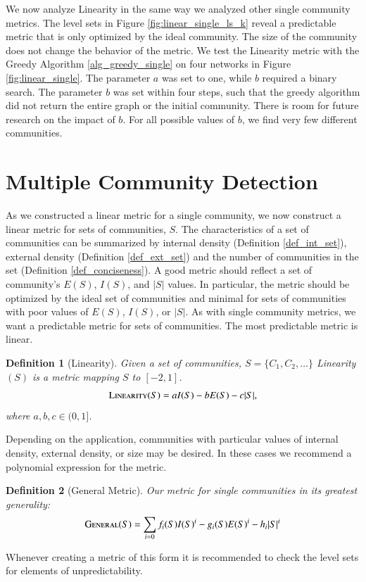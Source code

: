 \documentclass[phd,tocprelim]{cornell}
\newtheorem{definition}{Definition}
\begin{document}
We now analyze {\sc Linearity} in the same way we analyzed other single community metrics.  The level sets in Figure \ref{fig:linear_single_ls_k} reveal a predictable metric that is only optimized by the ideal community. The size of the community does not change the behavior of the metric.  We test the {\sc Linearity} metric  with the Greedy Algorithm \ref{alg_greedy_single} on four networks in Figure \ref{fig:linear_single}.  The parameter $a$ was set to one, while $b$ required a binary search.  The parameter $b$ was set within four steps, such that the greedy algorithm did not return the entire graph or the initial community. There is room for future research on the impact of $b$.  For all possible values of $b$, we find very few different communities.





\section{Multiple Community Detection}

As we constructed a linear metric for a single community, we now construct a linear metric for sets of communities, $S$.  The characteristics of a set of communities can be summarized by internal density (Definition \ref{def_int_set}), external density (Definition \ref{def_ext_set}) and the number of communities in the set (Definition \ref{def_conciseness}).  A good metric should reflect a set of community's $E(S)$, $I(S)$, and $|S|$ values.  In particular, the metric should be optimized by the ideal set of communities and minimal for sets of communities with poor values of $E(S)$, $I(S)$, or $|S|$.  As with single community metrics, we want a predictable metric for sets of communities.  The most predictable metric is linear.
\begin{definition}[Linearity] Given a set of communities, $S = \{C_1, C_2, \dots \}$ {\sc Linearity}$(S)$ is a metric mapping $S$ to $[-2, 1]$.
  \begin{equation}
   \mbox{\sc Linearity}(S) = a I(S) - b E(S) - c |S|,
  \end{equation}
where $a,b,c \in (0, 1]$.
\end{definition}
Depending on the application, communities with particular values of internal density, external density, or size may be desired.  In these cases we recommend a polynomial expression for the metric.
\begin{definition}[General Metric]
 Our metric for single communities in its greatest generality:
  \begin{equation}
   \mbox{\sc General} (S) = \sum\limits_{i = 0} f_i(S) I(S)^i - g_i(S) E(S)^i - h_i |S|^i
  \end{equation}
\end{definition}
Whenever creating a metric of this form it is recommended to check the level sets for elements of unpredictability.
\end{document}
